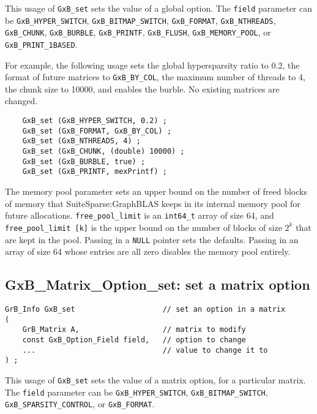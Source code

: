 \documentclass[12pt]{article}
\begin{document}
This usage of \verb'GxB_set' sets the value of a global option.
The \verb'field' parameter can be
\verb'GxB_HYPER_SWITCH',
\verb'GxB_BITMAP_SWITCH',
\verb'GxB_FORMAT',
\verb'GxB_NTHREADS',
\verb'GxB_CHUNK',
\verb'GxB_BURBLE',
\verb'GxB_PRINTF',
\verb'GxB_FLUSH',
\verb'GxB_MEMORY_POOL',
or
\verb'GxB_PRINT_1BASED'.

For example, the following usage sets the global hypersparsity ratio to 0.2,
the format of future matrices to \verb'GxB_BY_COL', the maximum number
of threads to 4, the chunk size to 10000, and enables the burble.
No existing matrices are changed.

{\footnotesize
\begin{verbatim}
    GxB_set (GxB_HYPER_SWITCH, 0.2) ;
    GxB_set (GxB_FORMAT, GxB_BY_COL) ;
    GxB_set (GxB_NTHREADS, 4) ;
    GxB_set (GxB_CHUNK, (double) 10000) ;
    GxB_set (GxB_BURBLE, true) ;
    GxB_set (GxB_PRINTF, mexPrintf) ;
\end{verbatim} }

The memory pool parameter sets an upper bound on the number of freed blocks of
memory that SuiteSparse:GraphBLAS keeps in its internal memory pool for future
allocations.   \verb'free_pool_limit'  is an \verb'int64_t' array of size 64,
and \verb'free_pool_limit [k]' is the upper bound on the number of blocks
of size $2^k$ that are kept in the pool.  Passing in a \verb'NULL' pointer
sets the defaults.  Passing in an array of size 64 whose entries are all zero
disables the memory pool entirely.

\newpage
\subsection{{\sf GxB\_Matrix\_Option\_set:} set a matrix option}

\begin{mdframed}[userdefinedwidth=6in]
{\footnotesize
\begin{verbatim}
GrB_Info GxB_set                    // set an option in a matrix
(
    GrB_Matrix A,                   // matrix to modify
    const GxB_Option_Field field,   // option to change
    ...                             // value to change it to
) ;
\end{verbatim} } \end{mdframed}

This usage of \verb'GxB_set' sets the value of a matrix option, for a
particular matrix.
The \verb'field' parameter can be
\verb'GxB_HYPER_SWITCH',
\verb'GxB_BITMAP_SWITCH',
\verb'GxB_SPARSITY_CONTROL', or
\verb'GxB_FORMAT'.
\end{document}
